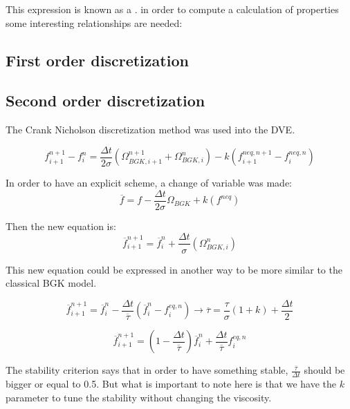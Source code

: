 \documentclass{article}
\begin{document}
This expression is known as a . in order to compute a calculation of properties some interesting relationships are needed:
\subsection{First order discretization}

\subsection{Second order discretization}
The Crank Nicholson discretization method was used into the DVE.

\begin{equation}
    f_{i+1}^{n+1} -f_{i}^{n} =\frac{\Delta t}{2\sigma}\left( \Omega _{BGK,i+1}^{n+1} +\Omega _{BGK,i}^{n}\right) -k\left( f_{i+1}^{neq,n+1} -f_{i}^{neq,n}\right)
\end{equation}

In order to have an explicit scheme, a change of variable was made:
\begin{equation}
    \overline{f} =f-\frac{\Delta t}{2\sigma}\Omega _{BGK} +k\left( f^{neq}\right)
\end{equation}

Then the new equation is:
\begin{equation}
    \overline{f}_{i+1}^{n+1} =\overline{f}_{i}^{n} +\frac{\Delta t}{\sigma}\left( \Omega _{BGK,i}^{n}\right)
\end{equation}

This new equation could be expressed in another way to be more similar to the classical BGK model.

\begin{equation}
    \overline{f}_{i+1}^{n+1} =\overline{f}_{i}^{n} -\frac{\Delta t}{\overline{\tau }}\left(\overline{f}_{i}^{n} -f_{i}^{eq,n}\right)\rightarrow \overline{\tau } =\frac{\tau}{\sigma} ( 1+k) +\frac{\Delta t}{2}
\end{equation}

\begin{equation*}
    \overline{f}_{i+1}^{n+1} =(1-\frac{\Delta t}{\overline{\tau }})\overline{f}_{i}^{n} + \frac{\Delta t}{\overline{\tau }}f_{i}^{eq,n}
\end{equation*}

The stability criterion says that in order to have something stable, $\frac{\overline{\tau}}{\Delta t}$ should be bigger or equal to 0.5.
But what is important to note here is that we have the $k$ parameter to tune the stability without changing the viscosity.
\end{document}
